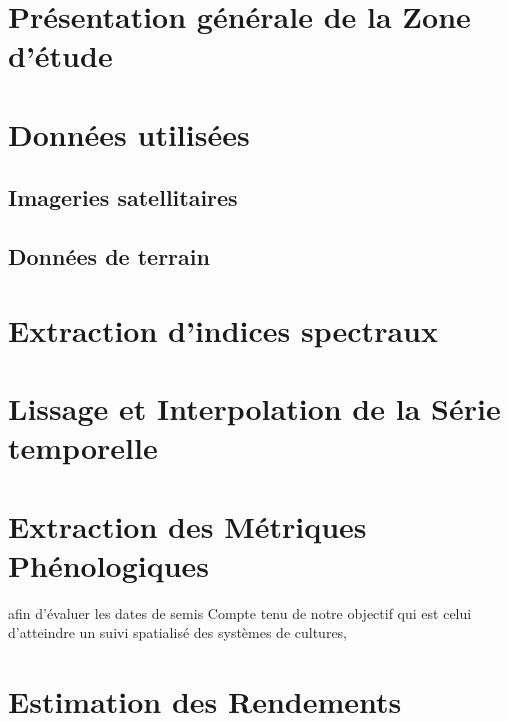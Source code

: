 \section{Présentation générale de la Zone d'étude}

\section{Données utilisées}

  \subsection{Imageries satellitaires}
  
  \subsection{Données de terrain}
  
\section{Extraction d'indices spectraux}

\section{Lissage et Interpolation de la Série temporelle}

\section{Extraction des Métriques Phénologiques}
afin d'évaluer les dates de semis
Compte tenu de notre objectif qui est celui d'atteindre un suivi spatialisé des systèmes de cultures,

\section{Estimation des Rendements}
